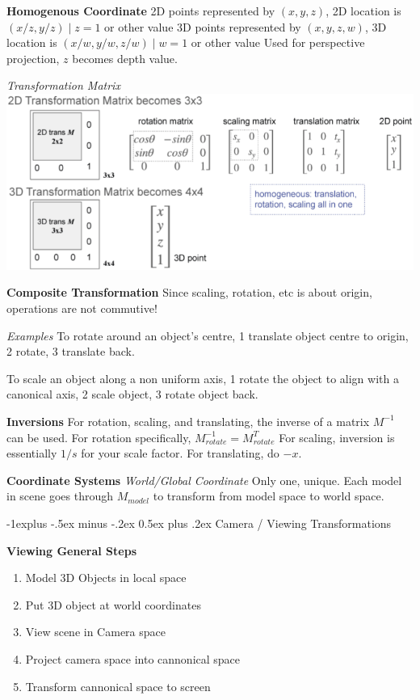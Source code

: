 \documentclass[letterpaper, 8pt]{extarticle}
\makeatletter
\renewcommand{\section}{\@startsection{section}{1}{0mm}%
                                {-1explus -.5ex minus -.2ex}%
                                {0.5ex plus .2ex}%
                                {\normalfont\small\bfseries}}
\makeatother
\begin{document}
\begin{multicols*}{4}
\textbf{Homogenous Coordinate}
2D points represented by \((x, y, z)\), 2D location is \((x/z, y/z) \mid z=1\) or other value
3D points represented by \((x, y, z, w)\), 3D location is \((x/w, y/w, z/w) \mid w=1\) or other value
Used for perspective projection, \(z\) becomes depth value.

\textit{Transformation Matrix}
\includegraphics[width=\linewidth]{homogenous-coord-transformation-matrix.png}

\textbf{Composite Transformation}
Since scaling, rotation, etc is about origin, operations are not commutive!

\textit{Examples}
To rotate around an object's centre, 1 translate object centre to origin, 2 rotate, 3 translate back.

To scale an object along a non uniform axis, 1 rotate the object to align with a canonical axis, 2 scale object, 3 rotate object back.

\textbf{Inversions}
For rotation, scaling, and translating,
the inverse of a matrix \(M^{-1}\) can be used.
For rotation specifically, \(M^{-1}_{rotate}=M^T_{rotate}\)
For scaling, inversion is essentially \(1/s\) for your scale factor.
For translating, do \(-x\).

\textbf{Coordinate Systems}
\textit{World/Global Coordinate}
Only one, unique.
Each model in scene goes through \(M_{model}\) to transform from model space to world space.

\section{Camera / Viewing Transformations}


\textbf{Viewing General Steps}
\begin{enumerate}
    \item Model 3D Objects in local space
    \item Put 3D object at world coordinates
    \item View scene in Camera space
    \item Project camera space into cannonical space
    \item Transform cannonical space to screen
\end{enumerate}


\end{multicols*}
\end{document}
